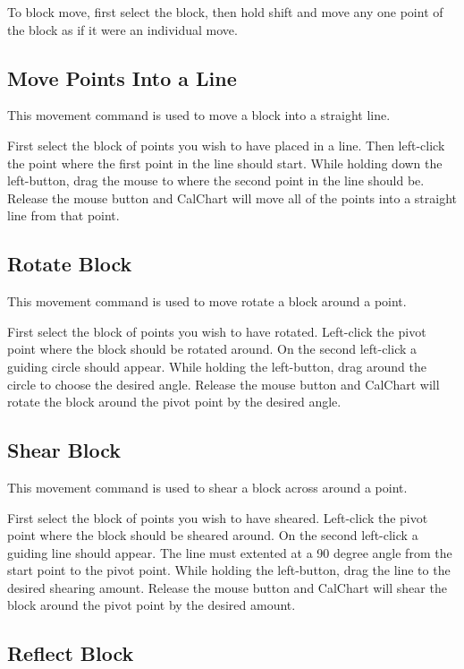 To block move, first select
the block, then hold shift and move any one point of the block as if it
were an individual move.

\subsection{Move Points Into a Line}\label{movepointsintoaline}

This movement command is used to move a block into a straight line.

First select the block of points you wish to have placed in a line.  Then
left-click the point where the first point in the line should start.  While
holding down the left-button, drag the mouse to where the second point in the
line should be.  Release the mouse button and CalChart will move all of the 
points into a straight line from that point.

\subsection{Rotate Block}\label{rotateblock}

This movement command is used to move rotate a block around a point.

First select the block of points you wish to have rotated.  Left-click the 
pivot point where the block should be rotated around.  On the second left-click
a guiding circle should appear.  While holding the left-button, drag around
the circle to choose the desired angle.  Release the mouse button and CalChart
will rotate the block around the pivot point by the desired angle.

\subsection{Shear Block}\label{shearblock}

This movement command is used to shear a block across around a point.

First select the block of points you wish to have sheared.  Left-click the 
pivot point where the block should be sheared around.  On the second left-click
a guiding line should appear.  The line must extented at a 90 degree angle 
from the start point to the pivot point.   While holding the left-button, drag
the line to the desired shearing amount.  Release the mouse button and CalChart
will shear the block around the pivot point by the desired amount.

\subsection{Reflect Block}\label{reflectblock}

